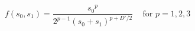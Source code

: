 \begin{equation}\label{2fss}
  f(s_0,s_1)
   =\frac{{s_0}^p}{2^{p-1}(s_0+s_1)^{p+D'/2}}\,\,\,\,\,\,\,\mbox{for}\,\,p=1,2,3
\end{equation}

